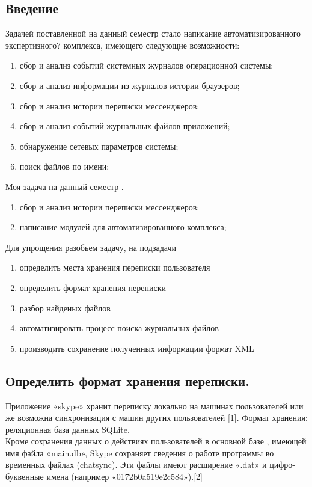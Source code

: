 \newpage

\subsection{Введение}

Задачей поставленной на данный семестр стало написание автоматизированного экспертизного? комплекса, имеющего следующие возможности: 

\begin{enumerate}
\item сбор и анализ событий системных журналов операционной системы;
\item сбор и анализ информации из журналов истории браузеров;
\item сбор и анализ истории переписки мессенджеров;
\item сбор и анализ событий журнальных файлов приложений;
\item обнаружение сетевых параметров системы;
\item поиск файлов по имени;
\end{enumerate}

Моя задача на данный семестр . 

\begin{enumerate}
\item сбор и анализ истории переписки мессенджеров;
\item написание модулей для автоматизированного комплекса;
\end{enumerate}

Для упрощения разобьем задачу, на подзадачи
\begin{enumerate}
\item определить места хранения переписки пользователя
\item определить формат хранения переписки
\item разбор найденых файлов
\item автоматизировать процесс поиска журнальных файлов
\item производить сохранение полученных информации формат XML
\end{enumerate}

\subsection{Определить формат хранения переписки.}

Приложение «skype» хранит переписку локально на машинах пользователей или же возможна синхронизация с машин других пользователей [1]. Формат хранения: реляционная база данных SQLite.\\
Кроме сохранения данных о действиях пользователей
в основной базе , имеющей имя файла «main.db», Skype сохраняет сведения о работе программы во временных файлах (chatsync). Эти файлы имеют расширение «.dat» и цифро-буквенные имена (например «0172b0a519e2c584»).[2]


